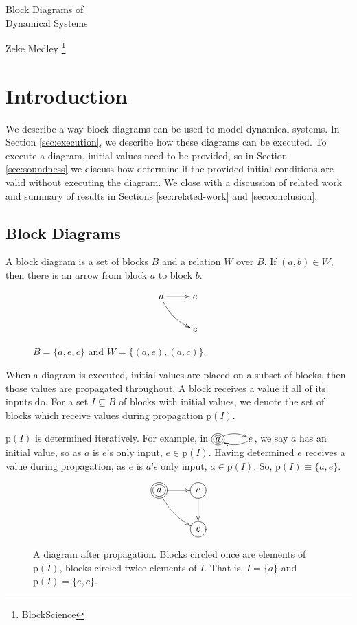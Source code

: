 \documentclass[twocolumn]{article}
\begin{document}
\LARGE
\noindent Block Diagrams of \\ Dynamical Systems \par
\vspace{0.68em}
\large
\noindent Zeke Medley \footnote[1]{BlockScience}
\normalsize

\section{Introduction}

We describe a way block diagrams can be used to model dynamical systems. In Section \ref{sec:execution}, we describe how these diagrams can be executed. To execute a diagram, initial values need to be provided, so in Section \ref{sec:soundness} we discuss how determine if the provided initial conditions are valid without executing the diagram. We close with a discussion of related work and summary of results in Sections \ref{sec:related-work} and \ref{sec:conclusion}.

\subsection{Block Diagrams}

A block diagram is a set of blocks $B$ and a relation $W$ over $B$. If $(a, b)\in W$, then there is an arrow from block $a$ to block $b$. 


\begin{figure}[h]
\[
    \xymatrix {
        a \ar[r] \ar@/_/[dr] & e \\
        & c
    }
\]
    \caption{$B=\{a, e, c\}$ and $W=\{(a,e), (a, c)\}$.}
    \label{fig:example1}
\end{figure}

When a diagram is executed, initial values are placed on a subset of blocks, then those values are propagated throughout. A block receives a value if all of its inputs do. For a set $I\subseteq B$ of blocks with initial values, we denote the set of blocks which receive values during propagation $\text{p}(I)$.

$\text{p}(I)$ is determined iteratively. For example, in $\xymatrix@1{*++++[o][F=]{a} \ar@/^/[r] & e \ar@/^/[l]}$, we say $a$ has an initial value, so as $a$ is $e$'s only input, $e\in \text{p}(I)$. Having determined $e$ receives a value during propagation, as $e$ is $a$'s only input, $a\in \text{p}(I)$. So, $\text{p}(I)\equiv \{a, e\}$.

\begin{figure}[h]
\[
    \xymatrix {
        *++[o][F=]{a} \ar[r] \ar@/_/[dr] & *++[o][F-]{e} \ar[d] \\
        & *++[o][F-]{c}
    }
\]
    \caption{A diagram after propagation. Blocks circled once are elements of $\text{p}(I)$, blocks circled twice elements of $I$. That is, $I=\{a\}$ and $\text{p}(I)=\{e, c\}$.}
    \label{fig:piisnoti}
\end{figure}
\end{document}
